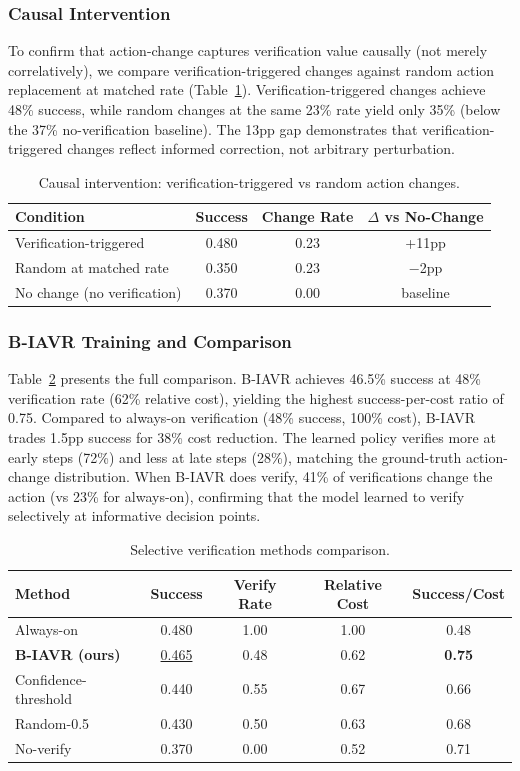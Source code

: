 \documentclass[11pt]{article}
\begin{document}
\subsubsection{Causal Intervention}

To confirm that action-change captures verification value causally (not merely correlatively), we compare verification-triggered changes against random action replacement at matched rate (Table~\ref{tab:causal}). Verification-triggered changes achieve 48\% success, while random changes at the same 23\% rate yield only 35\% (below the 37\% no-verification baseline). The 13pp gap demonstrates that verification-triggered changes reflect informed correction, not arbitrary perturbation.

\begin{table}[h]
\centering
\caption{Causal intervention: verification-triggered vs random action changes.}
\label{tab:causal}
\begin{tabular}{lccc}
\toprule
Condition & Success & Change Rate & $\Delta$ vs No-Change \\
\midrule
Verification-triggered & 0.480 & 0.23 & +11pp \\
Random at matched rate & 0.350 & 0.23 & $-$2pp \\
No change (no verification) & 0.370 & 0.00 & baseline \\
\bottomrule
\end{tabular}
\end{table}

\subsubsection{B-IAVR Training and Comparison}

Table~\ref{tab:biavr} presents the full comparison. B-IAVR achieves 46.5\% success at 48\% verification rate (62\% relative cost), yielding the highest success-per-cost ratio of 0.75. Compared to always-on verification (48\% success, 100\% cost), B-IAVR trades 1.5pp success for 38\% cost reduction. The learned policy verifies more at early steps (72\%) and less at late steps (28\%), matching the ground-truth action-change distribution. When B-IAVR does verify, 41\% of verifications change the action (vs 23\% for always-on), confirming that the model learned to verify selectively at informative decision points.

\begin{table}[h]
\centering
\caption{Selective verification methods comparison.}
\label{tab:biavr}
\begin{tabular}{lcccc}
\toprule
Method & Success & Verify Rate & Relative Cost & Success/Cost \\
\midrule
Always-on & 0.480 & 1.00 & 1.00 & 0.48 \\
\textbf{B-IAVR (ours)} & \underline{0.465} & 0.48 & 0.62 & \textbf{0.75} \\
Confidence-threshold & 0.440 & 0.55 & 0.67 & 0.66 \\
Random-0.5 & 0.430 & 0.50 & 0.63 & 0.68 \\
No-verify & 0.370 & 0.00 & 0.52 & 0.71 \\
\bottomrule
\end{tabular}
\end{table}
\end{document}
